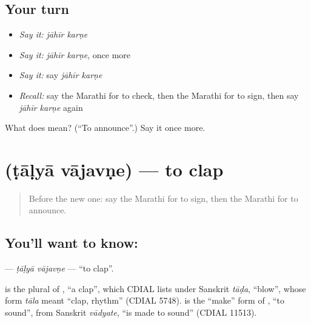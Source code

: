 \subsection*{Your turn}
\begin{itemize}
\raggedright
  \item \emph{Say it:} \emph{jāhīr karṇe}
  \item \emph{Say it:} \emph{jāhīr karṇe}, once more
  \item \emph{Say it:} say \emph{jāhīr karṇe}
  \item \emph{Recall:} say the Marathi for to check, then the Marathi for to sign, then say \emph{jāhīr karṇe} again
\end{itemize}

\begin{tcolorbox}[breakable,colback=teal!4,colframe=teal!35!black,title={Before you move on}]
What does   mean? (\textquotedblleft{}To announce\textquotedblright{}.) Say it once more.
\end{tcolorbox}
\section[\texorpdfstring{\mr{टाळ्या} \mr{वाजवणे} (ṭāḷyā vājavṇe)}{टाळ्या वाजवणे (ṭāḷyā vājavṇe)}]{  (ṭāḷyā vājavṇe) — to clap}

\label{lesson:MR-C164-talya-vajavne}



\begin{quote}
Before the new one: say the Marathi for to sign, then the Marathi for to announce.
\end{quote}

\subsection*{You'll want to know:  }
\textbf{ } — \emph{ṭāḷyā vājavṇe} — \textquotedblleft{}to clap\textquotedblright{}.

\begin{cousinweb}
\textbf{} is the plural of \textbf{}, \textquotedblleft{}a clap\textquotedblright{}, which CDIAL lists under Sanskrit \emph{tāḍa}, \textquotedblleft{}blow\textquotedblright{}, whose form \emph{tāla} meant \textquotedblleft{}clap, rhythm\textquotedblright{} (CDIAL 5748). \textbf{} is the \textquotedblleft{}make\textquotedblright{} form of \textbf{}, \textquotedblleft{}to sound\textquotedblright{}, from Sanskrit \emph{vādyate}, \textquotedblleft{}is made to sound\textquotedblright{} (CDIAL 11513).
\end{cousinweb}

